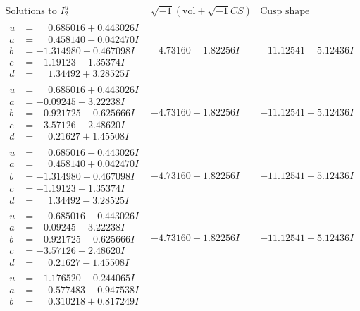 \documentclass[1p]{elsarticle_modified}
\theoremstyle{definition}
\newcommand{\I}{\sqrt{-1}}
\begin{document}
$$\begin{array}{c|c|c}  
\text{Solutions to }I^u_{2}& \I (\text{vol} + \sqrt{-1}CS) & \text{Cusp shape}\\
 \hline 
\begin{aligned}
u &= \phantom{-}0.685016 + 0.443026 I \\
a &= \phantom{-}0.458140 - 0.042470 I \\
b &= -1.314980 - 0.467098 I \\
c &= -1.19123 - 1.35374 I \\
d &= \phantom{-}1.34492 + 3.28525 I\end{aligned}
 & -4.73160 + 1.82256 I & -11.12541 - 5.12436 I \\ \hline\begin{aligned}
u &= \phantom{-}0.685016 + 0.443026 I \\
a &= -0.09245 - 3.22238 I \\
b &= -0.921725 + 0.625666 I \\
c &= -3.57126 - 2.48620 I \\
d &= \phantom{-}0.21627 + 1.45508 I\end{aligned}
 & -4.73160 + 1.82256 I & -11.12541 - 5.12436 I \\ \hline\begin{aligned}
u &= \phantom{-}0.685016 - 0.443026 I \\
a &= \phantom{-}0.458140 + 0.042470 I \\
b &= -1.314980 + 0.467098 I \\
c &= -1.19123 + 1.35374 I \\
d &= \phantom{-}1.34492 - 3.28525 I\end{aligned}
 & -4.73160 - 1.82256 I & -11.12541 + 5.12436 I \\ \hline\begin{aligned}
u &= \phantom{-}0.685016 - 0.443026 I \\
a &= -0.09245 + 3.22238 I \\
b &= -0.921725 - 0.625666 I \\
c &= -3.57126 + 2.48620 I \\
d &= \phantom{-}0.21627 - 1.45508 I\end{aligned}
 & -4.73160 - 1.82256 I & -11.12541 + 5.12436 I \\ \hline\begin{aligned}
u &= -1.176520 + 0.244065 I \\
a &= \phantom{-}0.577483 - 0.947538 I \\
b &= \phantom{-}0.310218 + 0.817249 I \\

\end{aligned}
\end{array}$$
\end{document}
